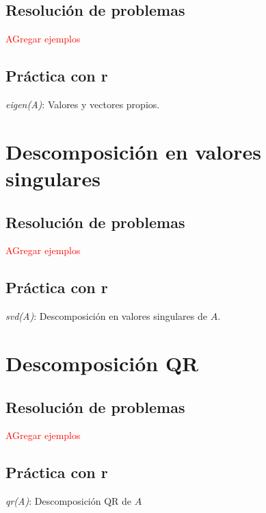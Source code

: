 \begin{}
\subsection{Resolución de problemas}

\textcolor{red}{AGregar ejemplos}

\subsection{Práctica con r}

\textit{eigen(A)}: Valores y vectores propios.


\section{Descomposición en valores singulares}

\subsection{Resolución de problemas}

\textcolor{red}{AGregar ejemplos}

\subsection{Práctica con r}

\textit{svd(A)}: Descomposición en valores singulares de $A$.


\section{Descomposición QR}

  
\subsection{Resolución de problemas}

\textcolor{red}{AGregar ejemplos}

\subsection{Práctica con r}

\textit{qr(A)}: Descomposición QR de $A$


\end{}
